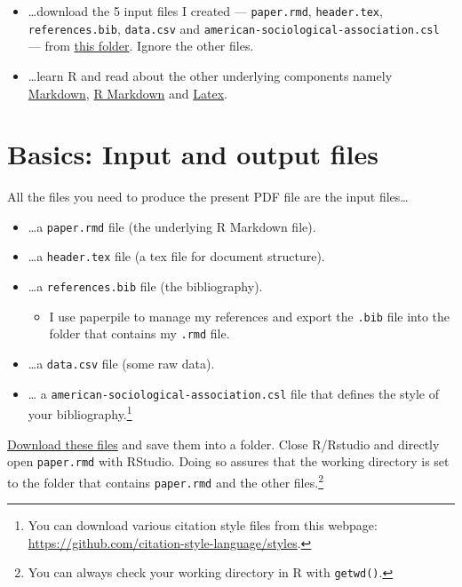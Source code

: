 \documentclass[12pt,]{article}
\providecommand{\tightlist}{%
  \setlength{\itemsep}{0pt}\setlength{\parskip}{0pt}}
\let\rmarkdownfootnote\footnote%
\def\footnote{\protect\rmarkdownfootnote}
\theoremstyle{definition}
\theoremstyle{definition}
\theoremstyle{definition}
\theoremstyle{remark}
\begin{document}
\begin{itemize}
\item
  \ldots{}download the 5 input files I created --- \texttt{paper.rmd},
  \texttt{header.tex}, \texttt{references.bib}, \texttt{data.csv} and
  \texttt{american-sociological-association.csl} --- from
  \href{https://drive.google.com/drive/folders/1zJP3cNPrHN-gj0rcmbHQgg-XA0hqDXdd?usp=sharing}{this
  folder}. Ignore the other files.
\item
  \ldots{}learn R and read about the other underlying components namely
  \href{https://en.wikipedia.org/wiki/Markdown}{Markdown},
  \href{https://rmarkdown.rstudio.com/lesson-1.html}{R Markdown} and
  \href{https://en.wikipedia.org/wiki/LaTeX}{Latex}.
\end{itemize}

\section{Basics: Input and output
files}\label{basics-input-and-output-files}

All the files you need to produce the present PDF file are the input
files\ldots{}

\begin{itemize}
\tightlist
\item
  \ldots{}a \texttt{paper.rmd} file (the underlying R Markdown file).
\item
  \ldots{}a \texttt{header.tex} file (a tex file for document
  structure).
\item
  \ldots{}a \texttt{references.bib} file (the bibliography).

  \begin{itemize}
  \tightlist
  \item
    I use paperpile to manage my references and export the \texttt{.bib}
    file into the folder that contains my \texttt{.rmd} file.
  \end{itemize}
\item
  \ldots{}a \texttt{data.csv} file (some raw data).
\item
  \ldots{} a \texttt{american-sociological-association.csl} file that
  defines the style of your bibliography.\footnote{You can download
    various citation style files from this webpage:
    \url{https://github.com/citation-style-language/styles}.}
\end{itemize}

\href{https://drive.google.com/drive/folders/1zJP3cNPrHN-gj0rcmbHQgg-XA0hqDXdd?usp=sharing}{Download
these files} and save them into a folder. Close R/Rstudio and directly
open \texttt{paper.rmd} with RStudio. Doing so assures that the working
directory is set to the folder that contains \texttt{paper.rmd} and the
other files.\footnote{You can always check your working directory in R
  with \texttt{getwd()}.}
\end{document}
